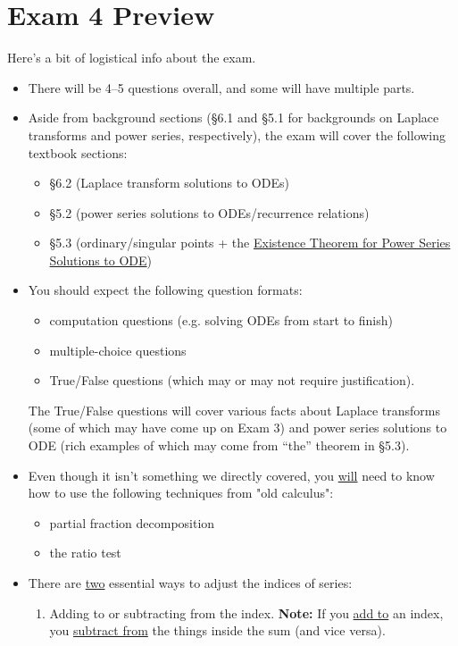 \documentclass[12pt]{article}
\theoremstyle{definition}
\theoremstyle{underl}
\begin{document}
	\section*{\centering Exam 4 Preview}
	
	\noindent Here's a bit of logistical info about the exam.
	\begin{itemize}[topsep=0.125in,itemsep=0.625mm]
		\item There will be 4--5 questions overall, and some will have multiple parts.
		\item Aside from background sections (\S6.1 and \S5.1 for backgrounds on Laplace transforms and power series, respectively), the exam will cover the following textbook sections: 
		\begin{itemize}[topsep=0mm]
			\item \S6.2 (Laplace transform solutions to ODEs) 
			\item \S5.2 (power series solutions to ODEs/recurrence relations)
			\item \S5.3 (ordinary/singular points + the \ul{Existence Theorem for Power Series Solutions to ODE})
		\end{itemize}
		\item You should expect the following question formats:
		\begin{itemize}[topsep=0mm]
			\item computation questions (e.g. solving ODEs from start to finish)
			\item multiple-choice questions
			\item True/False questions (which may or may not require justification).
		\end{itemize}
		The True/False questions will cover various facts about Laplace transforms (some of which may have come up on Exam 3) and power series solutions to ODE (rich examples of which may come from ``the'' theorem in \S5.3).
		\item Even though it isn't something we directly covered, you \ul{will} need to know how to use the following techniques from "old calculus":
		\begin{itemize}[topsep=0mm]
			\item partial fraction decomposition
			\item the ratio test
		\end{itemize}
		\item There are \ul{two} essential ways to adjust the indices of series:
		\begin{enumerate}
			\item Adding to or subtracting from the index. \textbf{Note:} If you \ul{add to} an index, you \ul{subtract from} the things inside the sum (and vice versa).
			

\end{enumerate}
\end{itemize}
\end{document}
